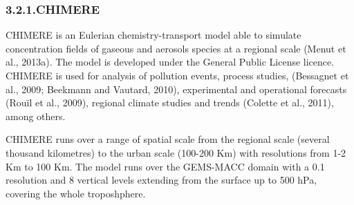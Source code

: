 \documentclass[9pt]{report}
\begin{document}
\subsubsection{3.2.1.\hspace*{0.5em}CHIMERE}\label{sec-chimere}%

\noindent{}CHIMERE is an Eulerian chemistry-transport model able to simulate concentration ﬁelds of gaseous and aerosols species at a regional scale (Menut et al., 2013a). 
The model is developed under the General Public License licence. CHIMERE is used for analysis of pollution events, process studies, (Bessagnet et al., 2009; Beekmann and Vautard, 2010), experimental and operational forecasts (Rouïl et al., 2009), regional climate studies and trends (Colette et al., 2011), among others.%

CHIMERE runs over a range of spatial scale from the regional scale (several thousand kilometres) to the urban scale (100-200 Km) with resolutions from 1-2 Km to 100 Km. 
The model runs over the GEMS-MACC domain with a 0.1\textdegree{} resolution and 8 vertical levels extending from the surface up to 500 hPa, covering the whole troposhphere.%
\end{document}
